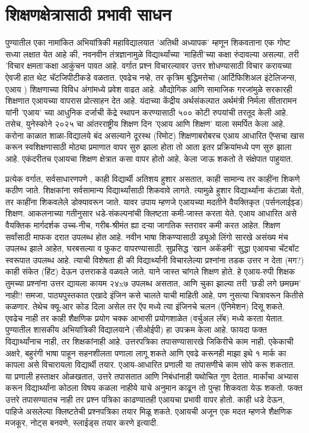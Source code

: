 \chapter{शिक्षणक्षेत्रासाठी प्रभावी साधन}

पुण्यातील एका नामांकित अभियांत्रिकी महाविद्यालयात 'अतिथी अध्यापक' म्हणून शिकवताना एक गोष्ट सध्या लक्षात येत आहे की, नवनवीन तंत्रज्ञानामुळे विद्यार्थ्यांच्या 'माहिती'च्या कक्षा रुंदावल्या असल्या, तरी 'विचार क्षमता'कक्षा आकुंचन पावत आहे. वर्गात प्रश्न विचारल्यावर उत्तर शोधण्यासाठी विचार करायच्या ऐवजी हात थेट चॅटजिपीटीकडे वळतात. एवढेच नव्हे, तर कृत्रिम बुद्धिमत्तेचा (आर्टिफिशिअल इंटेलिजन्स, एआय ) शिक्षणाच्या विविध अंगांमध्ये प्रवेश वाढत आहे. औद्योगिक आणि सामाजिक गरजांमुळे सरकारही शिक्षणात एआयच्या वापरास प्रोत्साहन देत आहे.  यंदाच्या केंद्रीय अर्थसंकल्पात अर्थमंत्री निर्मला सीतारामन यांनी 'एआय' च्या आधुनिक दर्जाची केंद्रे स्थापन करण्यासाठी ५०० कोटी रुपयांची तरतूद केली आहे. तसेच, युनेस्कोने २०२५ चा आंतरराष्ट्रीय शिक्षण दिन 'एआय आणि शिक्षण' याला समर्पित केला आहे. करोना काळात शाळा-विद्यालये बंद असल्याने दूरस्थ (रिमोट) शिक्षणाबरोबरच एआय आधारित ऍप्सचा खास करून स्वशिक्षणासाठी मोठ्या प्रमाणात वापर सुरु झाला होता तो आता इतर प्रक्रियांमध्ये पण सुरु झाला आहे. एकंदरीतच एआयचा शिक्षण क्षेत्रात कसा वापर होतो आहे, केला जाऊ शकतो ते संक्षेपात पाहुयात.

प्रत्येक वर्गात, सर्वसाधारणपणे , काही विद्यार्थी अतिशय हुशार असतात, काही सामान्य तर काहींना शिकणे कठीण जाते. शिक्षकांना सर्वसामान्य विद्यार्थ्यांसाठी शिकवावे लागते. त्यामुळे हुशार विद्यार्थ्यांना कंटाळा येतो, तर काहींना शिकवलेले डोक्यावरून जाते. यावर उपाय म्हणजे एआयच्या मदतीने वैयक्तिकृत (पर्सनलाईझ्ड) शिक्षण. आकलनाच्या गतीनुसार धडे-संकल्पनांची क्लिष्टता कमी-जास्त करता येते. एआय आधारित असे वैयक्तिक मार्गदर्शक उच्च-नीच, गरीब-श्रीमंत ह्या दऱ्या जागतिक स्तरावर कमी करत आहेत. शिक्षण सर्वांसाठी माफक दरात उपलब्ध होत आहे.  नवीन भाषा शिकण्यासाठी ड्यूओ लिंगो सारखे असंख्य मंच उपलब्ध झाले आहेत, घरबसल्या व फुकट वापरण्यासाठी. सुप्रसिद्ध 'खान अकॅडमी' सुद्धा एआयचा चॅटबॉट स्वरूपात उपलब्ध आहे. त्याची विशेषता ही की विद्यार्थ्यांनी विचारलेल्या प्रश्नांना तडक उत्तर न देता (मग?) काही संकेत (हिंट) देऊन उत्तराकडे वळवले जाते. याने जास्त चांगले शिक्षण होते. हे एआय-रुपी शिक्षक तुमच्या प्रश्नांना उत्तर द्यायला कायम २४x७ उपलब्ध असतात, आणि चुका झाल्या तरी 'छडी लगे छमछम' नाही!!  समजा, पाठ्यपुस्तकात एखादे इंजिन कसे चालते याची माहिती आहे, पण नुसत्या चित्रावरून कितीसे कळणार. तेथेच क्यू-आर कोड दिला असेल तर ऍप मध्ये त्या इंजिनचे चलन (ऍनिमेशन) दिसू शकते. एवढेच नाही तर काही शैक्षणिक प्रयोग चक्क आभासी प्रयोगशाळेत (वर्चुअल लॅब) मध्ये करता येतात. पुण्यातील शासकीय अभियांत्रिकी विद्यालयाने (सीओईपी) हा उपक्रम केला आहे. फायदा फक्त विद्यार्थ्यांनाच नाही, तर शिक्षकांनाही आहे. उत्तरपत्रिका तपासण्यासारखे जिकिरीचे काम नाही. एकेकाची अक्षरे, बहुरंगी भाषा पाहून सहनशीलता पणाला लागू शकते आणि एवढे करूनही माझा इथे १ मार्क का कापला असे विचारायला विद्यार्थी तयार. एआय-आधारित प्रणाली या तपासणीचे काम सोपे करू शकतात. या प्रणाली हस्ताक्षर ओळखतात, उत्तरे तपासतात आणि निबंधांनाही यथोचित गुण देतात. मार्कांचा अभ्यास करून विद्यार्थ्यांना कोठला विषय कळला नाहीये याचे अनुमान काढून तो पुन्हा शिकवता येऊ शकतो. फक्त उत्तरे तपासण्यातच नाही तर प्रश्न पत्रिका काढण्यातही एआयचा प्रभावी वापर होतो. काही धडे देऊन, पाहिजे असलेल्या क्लिष्टतेची प्रश्नपत्रिका तयार मिळू शकते. एआयची अजून एक मदत म्हणजे शैक्षणिक मजकूर, नोट्स बनवणे, स्लाईड्स तयार करणे इत्यादी.

